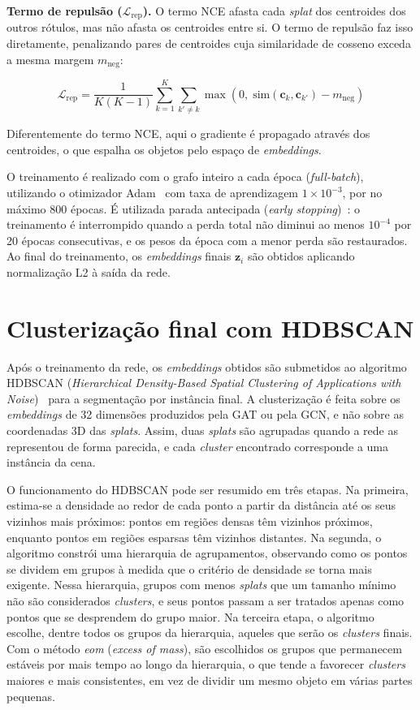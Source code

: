 \noindent\textbf{Termo de repulsão ($\mathcal{L}_{\text{rep}}$).} O termo NCE afasta cada \emph{splat} dos centroides dos outros rótulos, mas não afasta os centroides entre si. O termo de repulsão faz isso diretamente, penalizando pares de centroides cuja similaridade de cosseno exceda a mesma margem $m_{\text{neg}}$:

\[
\mathcal{L}_{\text{rep}} = \frac{1}{K(K-1)} \sum_{k=1}^{K} \sum_{k' \neq k} \max\left(0,\; \text{sim}(\mathbf{c}_k, \mathbf{c}_{k'}) - m_{\text{neg}}\right)
\]

Diferentemente do termo NCE, aqui o gradiente é propagado através dos centroides, o que espalha os objetos pelo espaço de \textit{embeddings}.

O treinamento é realizado com o grafo inteiro a cada época (\textit{full-batch}), utilizando o otimizador Adam~\cite{kingma2015adam} com taxa de aprendizagem $1 \times 10^{-3}$, por no máximo 800 épocas. É utilizada parada antecipada (\textit{early stopping})~\cite{prechelt1998early}: o treinamento é interrompido quando a perda total não diminui ao menos $10^{-4}$ por 20 épocas consecutivas, e os pesos da época com a menor perda são restaurados. Ao final do treinamento, os \textit{embeddings} finais $\mathbf{z}_i$ são obtidos aplicando normalização L2 à saída da rede.

\section{Clusterização final com HDBSCAN}

Após o treinamento da rede, os \textit{embeddings} obtidos são submetidos ao algoritmo HDBSCAN (\textit{Hierarchical Density-Based Spatial Clustering of Applications with Noise})~\cite{campello2015hierarchical} para a segmentação por instância final. A clusterização é feita sobre os \textit{embeddings} de 32 dimensões produzidos pela GAT ou pela GCN, e não sobre as coordenadas 3D das \emph{splats}. Assim, duas \emph{splats} são agrupadas quando a rede as representou de forma parecida, e cada \textit{cluster} encontrado corresponde a uma instância da cena. 

O funcionamento do HDBSCAN pode ser resumido em três etapas. Na primeira, estima-se a densidade ao redor de cada ponto a partir da distância até os seus vizinhos mais próximos: pontos em regiões densas têm vizinhos próximos, enquanto pontos em regiões esparsas têm vizinhos distantes. Na segunda, o algoritmo constrói uma hierarquia de agrupamentos, observando como os pontos se dividem em grupos à medida que o critério de densidade se torna mais exigente. Nessa hierarquia, grupos com menos \emph{splats} que um tamanho mínimo não são considerados \textit{clusters}, e seus pontos passam a ser tratados apenas como pontos que se desprendem do grupo maior. Na terceira etapa, o algoritmo escolhe, dentre todos os grupos da hierarquia, aqueles que serão os \textit{clusters} finais. Com o método \textit{eom} (\textit{excess of mass}), são escolhidos os grupos que permanecem estáveis por mais tempo ao longo da hierarquia, o que tende a favorecer \textit{clusters} maiores e mais consistentes, em vez de dividir um mesmo objeto em várias partes pequenas.

